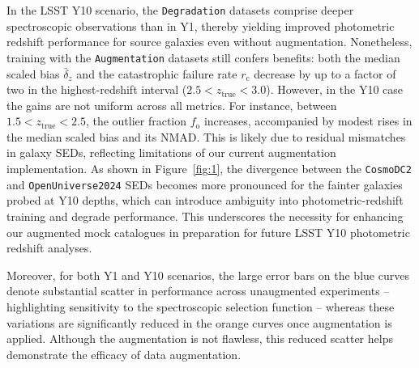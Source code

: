 In the LSST Y10 scenario, the \texttt{Degradation} datasets comprise deeper spectroscopic observations than in Y1, thereby yielding improved photometric redshift performance for source galaxies even without augmentation. Nonetheless, training with the \texttt{Augmentation} datasets still confers benefits: both the median scaled bias \(\bar{\delta}_z\) and the catastrophic failure rate \(r_{\mathrm{c}}\) decrease by up to a factor of two in the highest-redshift interval (\(2.5 < z_{\mathrm{true}} < 3.0\)). However, in the Y10 case the gains are not uniform across all metrics. For instance, between \(1.5 < z_{\mathrm{true}} < 2.5\), the outlier fraction \(f_\mathrm{o}\) increases, accompanied by modest rises in the median scaled bias and its NMAD. This is likely due to residual mismatches in galaxy SEDs, reflecting limitations of our current augmentation implementation. As shown in Figure~\ref{fig:1}, the divergence between the \texttt{CosmoDC2} and \texttt{OpenUniverse2024} SEDs becomes more pronounced for the fainter galaxies probed at Y10 depths, which can introduce ambiguity into photometric-redshift training and degrade performance. This underscores the necessity for enhancing our augmented mock catalogues in preparation for future LSST Y10 photometric redshift analyses. 

Moreover, for both Y1 and Y10 scenarios, the large error bars on the blue curves denote substantial scatter in performance across unaugmented experiments -- highlighting sensitivity to the spectroscopic selection function -- whereas these variations are significantly reduced in the orange curves once augmentation is applied. Although the augmentation is not flawless, this reduced scatter helps demonstrate the efficacy of data augmentation.

